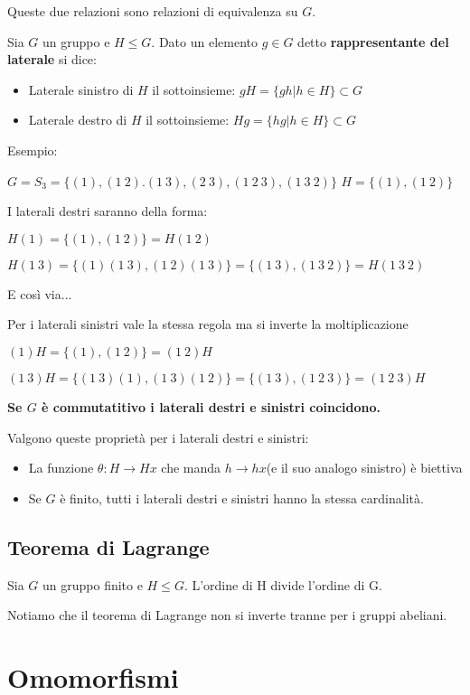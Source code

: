 \documentclass[a4paper, 10pt]{article}
\begin{document}
Queste due relazioni sono relazioni di equivalenza su $G$.

Sia $G$ un gruppo e $H \leq G$. Dato un elemento $g \in G$ detto \textbf{rappresentante del laterale} si dice:

\begin{itemize}
	\item Laterale sinistro di $H$ il sottoinsieme: $gH = \{gh | h \in H\} \subset G$
	\item Laterale destro di $H$ il sottoinsieme: $Hg = \{hg | h \in H\} \subset G$
\end{itemize}

Esempio:

$G=S_3=\{(1), (1\ 2). (1\ 3), (2\ 3), (1\ 2\ 3), (1\ 3\ 2)\}$
$H=\{(1), (1\ 2)\}$

I laterali destri saranno della forma: 

$H(1) = \{(1), (1\ 2)\} = H(1\ 2)$

$H(1\ 3) = \{(1)(1\ 3), (1\ 2)(1\ 3)\} = \{(1\ 3), (1\ 3\ 2)\} = H(1\ 3\ 2)$

E così via...

Per i laterali sinistri vale la stessa regola ma si inverte la moltiplicazione

$(1)H = \{(1), (1\ 2)\} = (1\ 2)H$

$(1\ 3)H = \{(1\ 3)(1), (1\ 3)(1\ 2)\} = \{(1\ 3), (1\ 2\ 3)\} = (1\ 2\ 3)H$

\textbf{Se $G$ è commutatitivo i laterali destri e sinistri coincidono.}

Valgono queste proprietà per i laterali destri e sinistri:

\begin{itemize}
	\item La funzione $\theta: H \rightarrow Hx$ che manda $h \rightarrow hx$(e il suo analogo sinistro) è biettiva
	\item Se $G$ è finito, tutti i laterali destri e sinistri hanno la stessa cardinalità.
\end{itemize}

\subsection{Teorema di Lagrange}

Sia $G$ un gruppo finito e $H \leq G$. L'ordine di H divide l'ordine di G.

Notiamo che il teorema di Lagrange non si inverte tranne per i gruppi abeliani.

\section{Omomorfismi}
\end{document}
